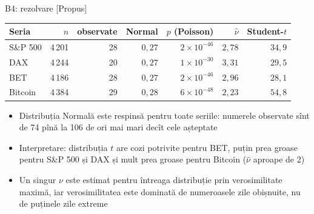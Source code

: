 \ifsolutions
\begin{frame}{B4: rezolvare [Propus]}
\itemsize{\footnotesize}
\begin{center}
\footnotesize
\begin{tabular}{lrrrrrr}
\toprule
Seria & $n$ & observate & Normal & $p$ (Poisson) & $\hat\nu$ & Student-$t$ \\
\midrule
S\&P 500 & 4\,201 & 28 & $0{,}27$ & ${2 \times 10^{-46}}$ & $2{,}78$ & $34{,}9$ \\
DAX & 4\,244 & 20 & $0{,}27$ & ${1 \times 10^{-30}}$ & $3{,}31$ & $29{,}5$ \\
BET & 4\,186 & 28 & $0{,}27$ & ${2 \times 10^{-46}}$ & $2{,}96$ & $28{,}1$ \\
Bitcoin & 4\,384 & 29 & $0{,}28$ & ${6 \times 10^{-48}}$ & $2{,}23$ & $54{,}8$ \\
\bottomrule
\end{tabular}
\end{center}
\begin{itemize}
    \item Distribuția Normală este respinsă pentru toate seriile: numerele observate sînt de 74 pînă la 106 de ori mai mari decît cele așteptate
    \item Interpretare: distribuția $t$ are cozi potrivite pentru BET, puțin prea groase pentru S\&P 500 și DAX și mult prea groase pentru Bitcoin ($\hat\nu$ aproape de 2)
    \item Un singur $\nu$ este estimat pentru întreaga distribuție prin verosimilitate maximă, iar verosimilitatea este dominată de numeroasele zile obișnuite, nu de puținele zile extreme
\end{itemize}
\end{frame}
\fi


